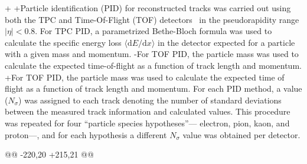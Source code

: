 +
+Particle identification (PID) for reconstructed tracks was carried out using both the TPC and Time-Of-Flight (TOF) detectors~\cite{Abelev:2014ffa, Akindinov:2013tea} in the pseudorapidity range $|\eta| < 0.8$.  
 For TPC PID, a parametrized Bethe-Bloch formula was used to calculate the specific energy loss $\langle \mathrm{d}E/\mathrm{d}x \rangle$ in the detector expected for a particle with a given mass and momentum.  
-For TOF PID, the particle mass was used to calculate the expected time-of-flight as a function of track length and momentum.  
+For TOF PID, the particle mass was used to calculate the expected time of flight as a function of track length and momentum.  
 For each PID method, a value ($N_{\sigma}$) was assigned to each track denoting the number of standard deviations between the measured track information and calculated values.  
 This procedure was repeated for four ``particle species hypotheses''--- electron, pion, kaon, and proton---, and for each hypothesis a different $N_{\sigma}$ value was obtained per detector.
 
@@ -220,20 +215,21 @@
